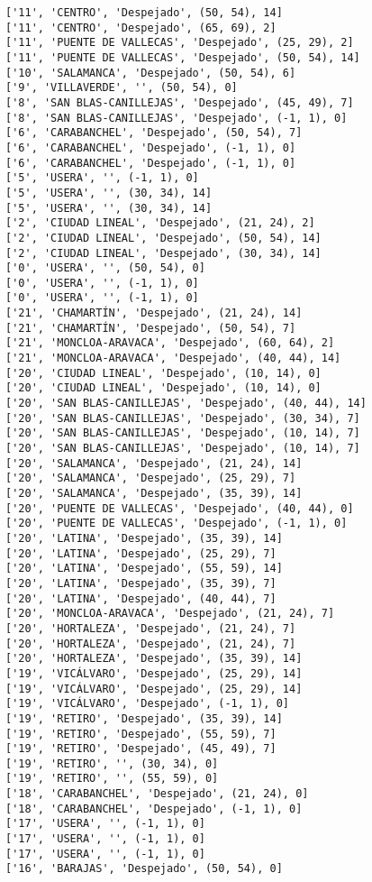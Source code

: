\documentclass[11pt]{article}
\begin{document}
\begin{Verbatim}[commandchars=\\\{\}]
['11', 'CENTRO', 'Despejado', (50, 54), 14]
['11', 'CENTRO', 'Despejado', (65, 69), 2]
['11', 'PUENTE DE VALLECAS', 'Despejado', (25, 29), 2]
['11', 'PUENTE DE VALLECAS', 'Despejado', (50, 54), 14]
['10', 'SALAMANCA', 'Despejado', (50, 54), 6]
['9', 'VILLAVERDE', '', (50, 54), 0]
['8', 'SAN BLAS-CANILLEJAS', 'Despejado', (45, 49), 7]
['8', 'SAN BLAS-CANILLEJAS', 'Despejado', (-1, 1), 0]
['6', 'CARABANCHEL', 'Despejado', (50, 54), 7]
['6', 'CARABANCHEL', 'Despejado', (-1, 1), 0]
['6', 'CARABANCHEL', 'Despejado', (-1, 1), 0]
['5', 'USERA', '', (-1, 1), 0]
['5', 'USERA', '', (30, 34), 14]
['5', 'USERA', '', (30, 34), 14]
['2', 'CIUDAD LINEAL', 'Despejado', (21, 24), 2]
['2', 'CIUDAD LINEAL', 'Despejado', (50, 54), 14]
['2', 'CIUDAD LINEAL', 'Despejado', (30, 34), 14]
['0', 'USERA', '', (50, 54), 0]
['0', 'USERA', '', (-1, 1), 0]
['0', 'USERA', '', (-1, 1), 0]
['21', 'CHAMARTÍN', 'Despejado', (21, 24), 14]
['21', 'CHAMARTÍN', 'Despejado', (50, 54), 7]
['21', 'MONCLOA-ARAVACA', 'Despejado', (60, 64), 2]
['21', 'MONCLOA-ARAVACA', 'Despejado', (40, 44), 14]
['20', 'CIUDAD LINEAL', 'Despejado', (10, 14), 0]
['20', 'CIUDAD LINEAL', 'Despejado', (10, 14), 0]
['20', 'SAN BLAS-CANILLEJAS', 'Despejado', (40, 44), 14]
['20', 'SAN BLAS-CANILLEJAS', 'Despejado', (30, 34), 7]
['20', 'SAN BLAS-CANILLEJAS', 'Despejado', (10, 14), 7]
['20', 'SAN BLAS-CANILLEJAS', 'Despejado', (10, 14), 7]
['20', 'SALAMANCA', 'Despejado', (21, 24), 14]
['20', 'SALAMANCA', 'Despejado', (25, 29), 7]
['20', 'SALAMANCA', 'Despejado', (35, 39), 14]
['20', 'PUENTE DE VALLECAS', 'Despejado', (40, 44), 0]
['20', 'PUENTE DE VALLECAS', 'Despejado', (-1, 1), 0]
['20', 'LATINA', 'Despejado', (35, 39), 14]
['20', 'LATINA', 'Despejado', (25, 29), 7]
['20', 'LATINA', 'Despejado', (55, 59), 14]
['20', 'LATINA', 'Despejado', (35, 39), 7]
['20', 'LATINA', 'Despejado', (40, 44), 7]
['20', 'MONCLOA-ARAVACA', 'Despejado', (21, 24), 7]
['20', 'HORTALEZA', 'Despejado', (21, 24), 7]
['20', 'HORTALEZA', 'Despejado', (21, 24), 7]
['20', 'HORTALEZA', 'Despejado', (35, 39), 14]
['19', 'VICÁLVARO', 'Despejado', (25, 29), 14]
['19', 'VICÁLVARO', 'Despejado', (25, 29), 14]
['19', 'VICÁLVARO', 'Despejado', (-1, 1), 0]
['19', 'RETIRO', 'Despejado', (35, 39), 14]
['19', 'RETIRO', 'Despejado', (55, 59), 7]
['19', 'RETIRO', 'Despejado', (45, 49), 7]
['19', 'RETIRO', '', (30, 34), 0]
['19', 'RETIRO', '', (55, 59), 0]
['18', 'CARABANCHEL', 'Despejado', (21, 24), 0]
['18', 'CARABANCHEL', 'Despejado', (-1, 1), 0]
['17', 'USERA', '', (-1, 1), 0]
['17', 'USERA', '', (-1, 1), 0]
['17', 'USERA', '', (-1, 1), 0]
['16', 'BARAJAS', 'Despejado', (50, 54), 0]

\end{Verbatim}
\end{document}
